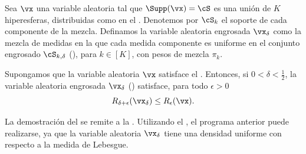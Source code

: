 \documentclass[../../book-main_es.tex]{subfiles}
\begin{document}
\begin{definition}\label{def:thickening-rv-uos}
    Sea $\vx$ una variable aleatoria tal que $\Supp(\vx) = \cS$ es una unión de
    $K$ hiperesferas, distribuidas como en el .
    Denotemos por $\cS_k$ el soporte de cada componente de la mezcla.
    Definamos la variable aleatoria engrosada $\vx_{\delta}$ como la mezcla de
    medidas en la que cada medida componente es uniforme en el conjunto engrosado
    $\cS_{k, \delta}$ (), para $k \in [K]$, con pesos de mezcla
    $\pi_k$.
\end{definition}

\begin{lemma}\label{lem:rate-distortion-lb-uos}
    Supongamos que la variable aleatoria $\vx$ satisface el
    . Entonces, si $0 < \delta < \tfrac{1}{2}$, la
    variable aleatoria engrosada $\vx_{\delta}$ ()
    satisface, para todo $\epsilon > 0$
    \begin{equation}
        R_{\delta + \epsilon}(\vx_{\delta})
        \leq
        R_{\epsilon}(\vx).
    \end{equation}
\end{lemma}

La demostración del  se remite a
la .
Utilizando el , el programa anterior puede realizarse,
ya que la variable aleatoria $\vx_{\delta}$ tiene una densidad uniforme
con respecto a la medida de Lebesgue.
\end{document}
